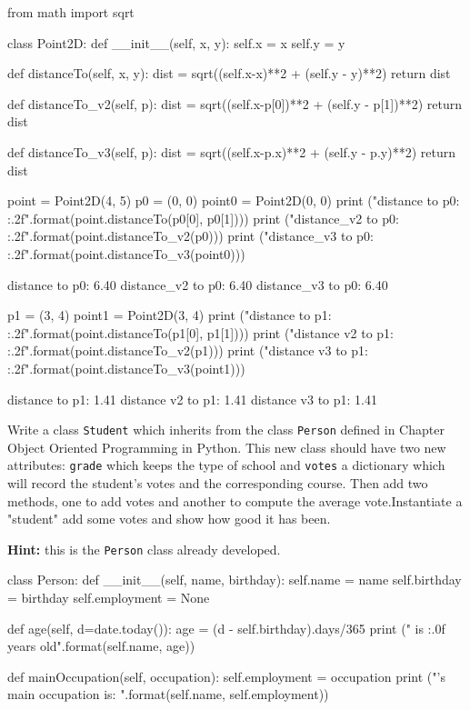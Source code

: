 \cprotEnv\begin{solution}
\begin{ipython}
from math import sqrt

class Point2D:
    def __init__(self, x, y):
        self.x = x
        self.y = y

    def distanceTo(self, x, y):
        dist = sqrt((self.x-x)**2 + (self.y - y)**2)
        return dist

    def distanceTo_v2(self, p):
        dist = sqrt((self.x-p[0])**2 + (self.y - p[1])**2)
        return dist

    def distanceTo_v3(self, p):
        dist = sqrt((self.x-p.x)**2 + (self.y - p.y)**2)
        return dist

point = Point2D(4, 5)
p0 = (0, 0)
point0 = Point2D(0, 0)
print ("distance to p0: {:.2f}".format(point.distanceTo(p0[0], p0[1])))
print ("distance_v2 to p0: {:.2f}".format(point.distanceTo_v2(p0)))
print ("distance_v3 to p0: {:.2f}".format(point.distanceTo_v3(point0)))
\end{ipython}
\begin{ioutput}
distance to p0: 6.40
distance_v2 to p0: 6.40
distance_v3 to p0: 6.40
\end{ioutput}
\begin{ipython}
p1 = (3, 4)
point1 = Point2D(3, 4)
print ("distance to p1: {:.2f}".format(point.distanceTo(p1[0], p1[1])))
print ("distance v2 to p1: {:.2f}".format(point.distanceTo_v2(p1)))
print ("distance v3 to p1: {:.2f}".format(point.distanceTo_v3(point1)))
\end{ipython}
\begin{ioutput}
distance to p1: 1.41
distance v2 to p1: 1.41
distance v3 to p1: 1.41
\end{ioutput}
\end{solution}

\cprotEnv\begin{question}
Write a class \texttt{Student} which inherits from the class \texttt{Person} defined in Chapter Object Oriented Programming in Python. This new class should have two new attributes: \texttt{grade} which keeps the type of school and \texttt{votes} a dictionary which will record the student's votes and the corresponding course. Then add two methods, one to add votes and another to compute the average vote.Instantiate a "student" add some votes and show how good it has been.

\noindent\textbf{Hint:} this is the \texttt{Person} class already developed.

\begin{ipython}
class Person:
    def __init__(self, name, birthday):
        self.name = name
        self.birthday = birthday
        self.employment = None

    def age(self, d=date.today()):
        age = (d - self.birthday).days/365
        print ("{} is {:.0f} years old".format(self.name, age))

    def mainOccupation(self, occupation):
        self.employment = occupation
        print ("{}'s main occupation is: {}".format(self.name, self.employment))
\end{ipython}
\end{question}


